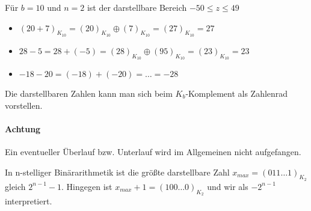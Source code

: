 \begin{example}
Für $b=10$ und $n=2$ ist der darstellbare Bereich $-50 \le  z \le 49$
\begin{itemize}
	\item $(20+7)_{K_{10}} = (20)_{K_{10}} \oplus (7)_{K_{10}} =(27)_{K_{10}}=27$
	\item $28-5 = 28+ (-5)= (28)_{K_{10}} \oplus (95)_{K_{10}} = (23)_{K_{10}} =23 $
	\item $-18-20= (-18)+(-20) = \ldots = -28$
\end{itemize}
\end{example}
Die darstellbaren Zahlen kann man sich beim $K_b$-Komplement als Zahlenrad vorstellen.


\paragraph{Achtung} Ein eventueller Überlauf bzw. Unterlauf wird im Allgemeinen nicht aufgefangen.
\begin{example}
In n-stelliger Binärarithmetik ist die größte darstellbare Zahl $x_{max} = (011\ldots 1)_{K_2}$ gleich  $2^{n-1}-1$. Hingegen ist $x_{max}+1=(100\ldots 0)_{K_2}$ und wir als $-2^{n-1}$ interpretiert.
\end{example}
